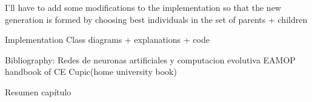 I'll have to add some modifications to the implementation so that the new generation is formed by choosing best individuals in the set of parents + children


Implementation
Class diagrams + explanations + code


Bibliography:
Redes de neuronas artificiales y computacion evolutiva
EAMOP
handbook of CE
Cupic(home university book)

%
%
%
%
%
%
%
%
%
%
%
%
Resumen capítulo
